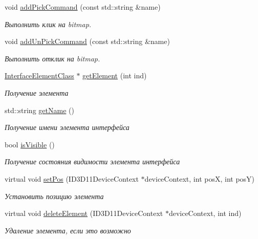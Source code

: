\begin{DoxyCompactItemize}
void \hyperlink{class_group_element_class_a4c6f9a1a30f7998884e90049e9532689}{add\+Pick\+Command} (const std\+::string \&name)
\begin{DoxyCompactList}\small\item\em Выполнить клик на bitmap. \end{DoxyCompactList}\item 
void \hyperlink{class_group_element_class_a253deff7c95f9311405dc99ba0ffe7c2}{add\+Un\+Pick\+Command} (const std\+::string \&name)
\begin{DoxyCompactList}\small\item\em Выполнить отклик на bitmap. \end{DoxyCompactList}\item 
\hyperlink{class_interface_element_class}{Interface\+Element\+Class} $\ast$ \hyperlink{class_group_element_class_ac30e4152465fa8409dfe3bf38e75cce7}{get\+Element} (int ind)
\begin{DoxyCompactList}\small\item\em Получение элемента \end{DoxyCompactList}\item 
std\+::string \hyperlink{class_interface_element_class_a7815b1d9629ff4dc8a83c170dbb171fc}{get\+Name} ()
\begin{DoxyCompactList}\small\item\em Получение имени элемента интерфейса \end{DoxyCompactList}\item 
bool \hyperlink{class_interface_element_class_a8d2250d84fd5bd69683dd3fe98becafd}{is\+Visible} ()
\begin{DoxyCompactList}\small\item\em Получение состояния видимости элемента интерфейса \end{DoxyCompactList}\item 
virtual void \hyperlink{class_interface_element_class_a15833d13e7a9c045032bf8498f25b9e6}{set\+Pos} (I\+D3\+D11\+Device\+Context $\ast$device\+Context, int posX, int posY)
\begin{DoxyCompactList}\small\item\em Установить позицию элемента \end{DoxyCompactList}\item 
virtual void \hyperlink{class_interface_element_class_ab8f17e3c917732a8d2ef85cb0cd65eda}{delete\+Element} (I\+D3\+D11\+Device\+Context $\ast$device\+Context, int ind)
\begin{DoxyCompactList}\small\item\em Удаление элемента, если это возможно \end{DoxyCompactList}\item 

\end{DoxyCompactItemize}
